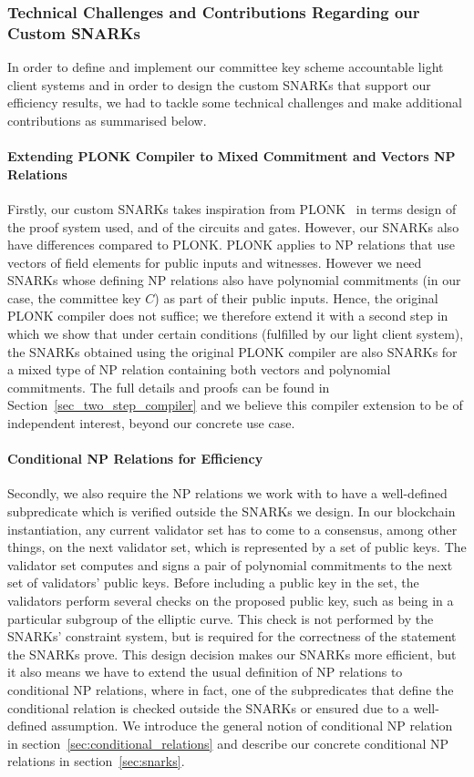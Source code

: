 \subsubsection{Technical Challenges and Contributions Regarding our Custom SNARKs} 
\label{sec:technical_challenges}
In order to define and implement our committee key scheme accountable light client systems and in order to design the custom SNARKs that support our efficiency results, 
we had to tackle some technical challenges and make additional contributions as summarised below.

\paragraph{Extending PLONK Compiler to Mixed Commitment and Vectors NP Relations} Firstly, our custom SNARKs takes inspiration from PLONK~\cite{plonk} in terms design of the proof system used, 
and of the circuits and gates. However, our SNARKs also have differences compared to PLONK. PLONK applies to NP relations  that use  vectors of field elements for 
public inputs and witnesses.  However we need SNARKs whose defining NP relations also have  polynomial commitments (in our case, the committee key $C$) 
as part of their public inputs. Hence, the original PLONK compiler does not suffice; we therefore extend it with a second step in which we show that under certain 
conditions (fulfilled by our light client system), the SNARKs obtained using the original PLONK compiler are also SNARKs for a mixed type of NP relation 
containing both vectors and polynomial commitments. The full details and proofs can be found in Section~\ref{sec_two_step_compiler} 
and we believe this compiler extension to be of independent interest, beyond our concrete use case. 

\paragraph{Conditional NP Relations for Efficiency} Secondly, we also require the NP relations we work with to have a well-defined subpredicate which is verified outside the SNARKs we design. In our blockchain instantiation, 
any current validator set has to come to a consensus, among other things, on the next validator set, which is represented by a set of public keys. The validator set 
computes and signs a pair of polynomial commitments to the next set of validators' public keys. Before including a public key in the set, the validators perform several 
checks on the proposed public key, such as being in a particular subgroup of the elliptic curve. This check is not performed by the SNARKs' constraint system, but is 
required for the correctness of the statement the SNARKs prove. This design decision makes our SNARKs more efficient, but it also means we have to extend the 
usual definition of NP relations to conditional NP relations, where in fact, one of the subpredicates that define the conditional relation is checked outside the SNARKs 
or ensured due to a well-defined assumption. We introduce the general notion of conditional NP relation in section~\ref{sec:conditional_relations} and describe our 
concrete conditional NP relations in section~\ref{sec:snarks}.   

